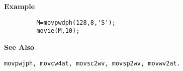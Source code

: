 {\bf \large {}\selectfont Example}
\begin{verbatim}
         M=movpwdph(128,8,'S'); 
         movie(M,10);
\end{verbatim}
\vspace*{.5cm}


{\bf \large {}\selectfont See Also}\\
\hspace*{1.5cm}
\begin{minipage}[t]{13.5cm}
\begin{verbatim}
movpwjph, movcw4at, movsc2wv, movsp2wv, movwv2at.
\end{verbatim}
\end{minipage}
